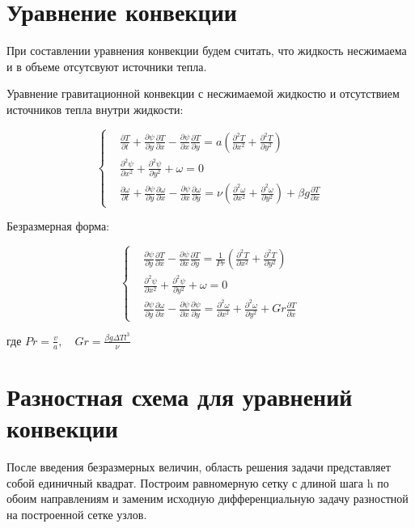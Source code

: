 \documentclass[a4paper, 12pt]{article}
\newcommand{\der}[2]{\frac{\partial {#1}}{\partial {#2}}}
\newcommand{\dder}[2]{\frac{\partial^2 {#1}}{\partial {#2}^2}}
\begin{document}
  \section{Уравнение конвекции}
    При составлении уравнения конвекции будем считать, что жидкость несжимаема и
    в объеме отсутсвуют источники тепла.

    Уравнение гравитационной конвекции с несжимаемой жидкостю и отсутствием
    источников тепла внутри жидкости:

    $$
      \left\{
        \begin{aligned}
          &\der{T}{t} + \der{\psi}{y} \der{T}{x} - \der{\psi}{x} \der{T}{y} =
            a \left( \dder{T}{x} + \dder{T}{y} \right)
          \\
          &\dder{\psi}{x} + \dder{\psi}{y} + \omega = 0
          \\
          &\der{\omega}{t} + \der{\psi}{y} \der{\omega}{x} - \der{\psi}{x}
            \der{\omega}{y} = \nu \left(
              \dder{\omega}{x} + \dder{\omega}{y}
            \right) + \beta g \der{T}{x}
        \end{aligned}
      \right.
    $$

    Безразмерная форма:

    $$
      \left\{
        \begin{aligned}
          &\der{\psi}{y} \der{T}{x} - \der{\psi}{x} \der{T}{y} = \frac{1}{Pr}
            \left( \dder{T}{x} + \dder{T}{y} \right)
          \\
          &\dder{\psi}{x} + \dder{\psi}{y} + \omega = 0
          \\
          &\der{\psi}{y} \der{\omega}{x} - \der{\psi}{x} \der{\psi}{y} =
            \dder{\omega}{x} + \dder{\omega}{y} + Gr \der{T}{x}
        \end{aligned}
      \right.
    $$

    где $Pr = \frac{v}{a}, \quad Gr = \frac{\beta g \Delta T l^{3}}{\nu}$
  \pagebreak

  \section{Разностная схема для уравнений конвекции}
    После введения безразмерных величин, область решения задачи представляет
    собой единичный квадрат. Построим равномерную сетку с длиной шага h по обоим
    направлениям и заменим исходную дифференциальную задачу разностной на
    построенной сетке узлов.
\end{document}
